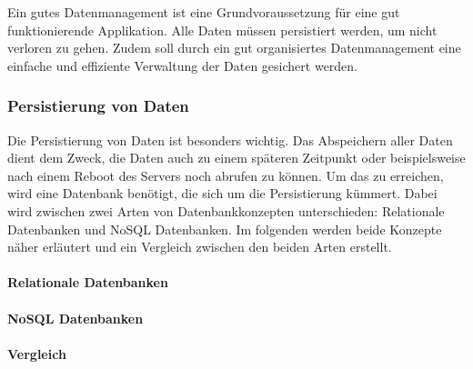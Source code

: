 
Ein gutes Datenmanagement ist eine Grundvoraussetzung für eine
gut funktionierende Applikation. Alle Daten müssen persistiert werden, um nicht verloren zu gehen. Zudem soll durch ein gut organisiertes Datenmanagement eine einfache und effiziente Verwaltung der Daten gesichert werden.

\subsubsection{Persistierung von Daten}
Die Persistierung von Daten ist besonders wichtig. Das Abspeichern aller Daten dient dem Zweck, die Daten auch zu einem späteren Zeitpunkt oder beispielsweise nach einem Reboot des Servers noch abrufen zu können. Um das zu erreichen, wird eine Datenbank benötigt, die sich um die Persistierung kümmert. Dabei wird zwischen zwei Arten von Datenbankkonzepten unterschieden: Relationale Datenbanken und NoSQL Datenbanken. Im folgenden werden beide Konzepte näher erläutert und ein Vergleich zwischen den beiden Arten erstellt.
\paragraph{Relationale Datenbanken}
\paragraph{NoSQL Datenbanken}
\paragraph{Vergleich}


